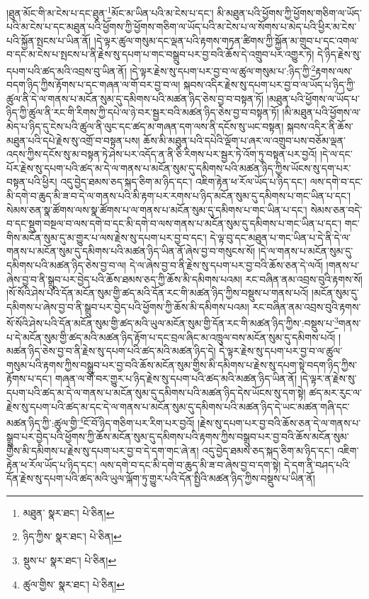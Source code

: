 །ཐུན་མོང་གི་མ་ངེས་པ་དང་ཐུན་\footnote{མཐུན་  སྣར་ཐང་།  པེ་ཅིན། }མོང་མ་ཡིན་པའི་མ་ངེས་པ་དང་། མི་མཐུན་པའི་ཕྱོགས་ཀྱི་ཕྱོགས་གཅིག་ལ་ཡོད་པའི་མ་ངེས་པ་དང་མཐུན་པའི་ཕྱོགས་ཀྱི་ཕྱོགས་གཅིག་ལ་ཡོད་པའི་མ་ངེས་པ་ལ་སོགས་པ་མེད་པའི་ཕྱིར་མ་ངེས་པའི་སྐྱོན་སྤངས་པ་ཡིན་ནོ། །དེ་ལྟར་ཚུལ་གསུམ་དང་ལྡན་པའི་རྟགས་གཏན་ཚིགས་ཀྱི་སྐྱོན་མ་གྲུབ་པ་དང་འགལ་བ་དང་མ་ངེས་པ་སྤངས་པ་ནི་རྗེས་སུ་དཔག་པ་གང་བསྒྲུབ་པར་བྱ་བའི་ཆོས་དེ་འགྲུབ་པར་འགྱུར་ཏེ། དེ་ཉིད་རྗེས་སུ་དཔག་པའི་ཚད་མའི་འབྲས་བུ་ཡིན་ནོ། །དེ་ལྟར་རྗེས་སུ་དཔག་པར་བྱ་བ་ལ་ཚུལ་གསུམ་པ་:ཉིད་ཀྱི་\footnote{ཉིད་ཀྱིས་  སྣར་ཐང་།  པེ་ཅིན། }རྟགས་ལས་བདག་ཉིད་ཀྱིས་རྟོགས་པ་དང་གཞན་ལ་གོ་བར་བྱ་བ་ལ། སྐབས་འདིར་རྗེས་སུ་དཔག་པར་བྱ་བ་ལ་ཡོད་པ་ཉིད་ཀྱི་ཚུལ་ནི་དེ་ལ་གནས་པ་མངོན་སུམ་དུ་དམིགས་པའི་མཚན་ཉིད་ཅེས་བྱ་བ་བསྟན་ཏོ། །མཐུན་པའི་ཕྱོགས་ལ་ཡོད་པ་ཉིད་ཀྱི་ཚུལ་ནི་རང་གི་རིགས་ཀྱི་དཔེ་ལ་ཉེ་བར་སྦྱར་བའི་མཚན་ཉིད་ཅེས་བྱ་བ་བསྟན་ཏོ། །མི་མཐུན་པའི་ཕྱོགས་ལ་མེད་པ་ཉིད་དུ་ངེས་པའི་ཚུལ་ནི་ལུང་དང་ཚད་མ་གཞན་དག་ལས་ནི་དངོས་སུ་ཡང་བསྟན། སྐབས་འདིར་ནི་ཆོས་མཐུན་པའི་དཔེ་རྗེས་སུ་འགྲོ་བ་བསྟན་པས། ཆོས་མི་མཐུན་པའི་དཔེའི་ལྡོག་པ་ཞར་ལ་འགྲུབ་པས་བཅོམ་ལྡན་འདས་ཀྱིས་དངོས་སུ་མ་བསྟན་ཏེ་ཤེས་པར་འདོད་ན་ནི་ཅི་རིགས་པར་སྦྱར་ཏེ་འོག་ཏུ་བསྟན་པར་བྱའོ། །དེ་ལ་དང་པོར་རྗེས་སུ་དཔག་པའི་ཚད་མ་དེ་ལ་གནས་པ་མངོན་སུམ་དུ་དམིགས་པའི་མཚན་ཉིད་ཀྱིས་ཡོངས་སུ་དག་པར་བསྟན་པའི་ཕྱིར། འདུ་བྱེད་ཐམས་ཅད་སྐད་ཅིག་མ་ཉིད་དང་། འཇིག་རྟེན་ཕ་རོལ་ཡོད་པ་ཉིད་དང་། ལས་དགེ་བ་དང་མི་དགེ་བ་ཆུད་མི་ཟ་བ་དེ་ལ་གནས་པའི་མི་རྟག་པར་རགས་པ་ཉིད་མངོན་སུམ་དུ་དམིགས་པ་གང་ཡིན་པ་དང་། སེམས་ཅན་སྣ་ཚོགས་ལས་སྣ་ཚོགས་པ་ལ་གནས་པ་མངོན་སུམ་དུ་དམིགས་པ་གང་ཡིན་པ་དང་། སེམས་ཅན་བདེ་བ་དང་སྡུག་བསྔལ་བ་ལས་དགེ་བ་དང་མི་དགེ་བ་ལས་གནས་པ་མངོན་སུམ་དུ་དམིགས་པ་གང་ཡིན་པ་དང་། གང་གིས་མངོན་སུམ་དུ་མ་གྱུར་པ་ལས་རྗེས་སུ་དཔག་པར་བྱ་བ་དང་། དེ་ལྟ་བུ་དང་མཐུན་པ་གང་ཡིན་པ་དེ་ནི་དེ་ལ་གནས་པ་མངོན་སུམ་དུ་དམིགས་པའི་མཚན་ཉིད་ཡིན་ནོ་ཞེས་བྱ་བ་གསུངས་སོ། །དེ་ལ་གནས་པ་མངོན་སུམ་དུ་དམིགས་པའི་མཚན་ཉིད་ཅེས་བྱ་བ་ལ། དེ་ལ་ཞེས་བྱ་བ་ནི་རྗེས་སུ་དཔག་པར་བྱ་བའི་ཆོས་ཅན་དེ་ལའོ། །གནས་པ་ཞེས་བྱ་བ་ནི་སྒྲུབ་པར་བྱེད་པའི་ཆོས་ཐམས་ཅད་ཀྱི་ཆོས་མི་དམིགས་པའམ། རང་བཞིན་ནམ་འབྲས་བུའི་རྟགས་སོ། །སོ་སོའི་ཤེས་པའི་དོན་མངོན་སུམ་གྱི་ཚད་མའི་དོན་རང་གི་མཚན་ཉིད་ཀྱིས་བསྡུས་པ་གནས་པའོ། །མངོན་སུམ་དུ་དམིགས་པ་ཞེས་བྱ་བ་ནི་སྒྲུབ་པར་བྱེད་པའི་ཕྱོགས་ཀྱི་ཆོས་མི་དམིགས་པའམ། རང་བཞིན་ནམ་འབྲས་བུའི་རྟགས་སོ་སོའི་ཤེས་པའི་དོན་མངོན་སུམ་གྱི་ཚད་མའི་ཡུལ་མངོན་སུམ་གྱི་དོན་རང་གི་མཚན་ཉིད་ཀྱིས་:བསྡུས་པ་\footnote{སྡུས་པ་  སྣར་ཐང་།  པེ་ཅིན། }གནས་པ་དེ་མངོན་སུམ་གྱི་ཚད་མའི་མཚན་ཉིད་རྟོག་པ་དང་བྲལ་ཞིང་མ་འཁྲུལ་བས་མངོན་སུམ་དུ་དམིགས་པའོ། །མཚན་ཉིད་ཅེས་བྱ་བ་ནི་རྗེས་སུ་དཔག་པའི་ཚད་མའི་མཚན་ཉིད་དེ། དེ་ལྟར་རྗེས་སུ་དཔག་པར་བྱ་བ་ལ་ཚུལ་གསུམ་པའི་རྟགས་ཀྱིས་བསྒྲུབ་པར་བྱ་བའི་ཆོས་མངོན་སུམ་གྱིས་མི་དམིགས་པ་རྗེས་སུ་དཔག་སྟེ་བདག་ཉིད་ཀྱིས་རྟོགས་པ་དང་། གཞན་ལ་གོ་བར་གྱུར་པ་ཉིད་རྗེས་སུ་དཔག་པའི་ཚད་མའི་མཚན་ཉིད་ཡིན་ནོ། །དེ་ལྟར་ན་རྗེས་སུ་དཔག་པའི་ཚད་མ་དེ་ལ་གནས་པ་མངོན་སུམ་དུ་དམིགས་པའི་མཚན་ཉིད་དེས་ཡོངས་སུ་དག་སྟེ། ཚད་མར་རུང་ལ་རྗེས་སུ་དཔག་པའི་ཚད་མ་དང་དེ་ལ་གནས་པ་མངོན་སུམ་དུ་དམིགས་པའི་མཚན་ཉིད་དེ་ཡང་མཚན་གཞི་དང་མཚན་ཉིད་ཀྱི་:ཚུལ་གྱི་\footnote{ཚུལ་གྱིས་  སྣར་ཐང་།  པེ་ཅིན། }ངོ་བོ་ཉིད་གཅིག་པར་རིག་པར་བྱའོ། །རྗེས་སུ་དཔག་པར་བྱ་བའི་ཆོས་ཅན་དེ་ལ་གནས་པ་སྒྲུབ་པར་བྱེད་པའི་ཕྱོགས་ཀྱི་ཆོས་མངོན་སུམ་དུ་དམིགས་པའི་རྟགས་ཀྱིས་བསྒྲུབ་པར་བྱ་བའི་ཆོས་མངོན་སུམ་གྱིས་མི་དམིགས་པ་རྗེས་སུ་དཔག་པར་བྱ་བ་དེ་དག་གང་ཞེ་ན། འདུ་བྱེད་ཐམས་ཅད་སྐད་ཅིག་མ་ཉིད་དང་། འཇིག་རྟེན་ཕ་རོལ་ཡོད་པ་ཉིད་དང་། ལས་དགེ་བ་དང་མི་དགེ་བ་ཆུད་མི་ཟ་བ་ཞེས་བྱ་བ་དག་སྟེ། དེ་དག་ནི་བཤད་པའི་དོན་རྗེས་སུ་དཔག་པའི་ཚད་མའི་ཡུལ་ལྐོག་ཏུ་གྱུར་པའི་དོན་སྤྱིའི་མཚན་ཉིད་ཀྱིས་བསྡུས་པ་ཡིན་ནོ། 